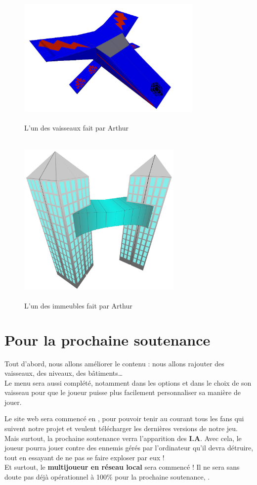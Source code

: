 \documentclass[10pt, titlepage]{report}
\begin{document}
\begin{figure}
\center
\includegraphics[height=6cm, width=9cm]{vaisseau_arthur.jpg}
\caption{L'un des vaisseaux fait par Arthur}

\includegraphics[height=8.5cm, width=8cm]{batiment_arthur.jpg}
\caption{L'un des immeubles fait par Arthur}

\end{figure}

\chapter{Pour la prochaine soutenance}

Tout d'abord, nous allons améliorer le contenu : nous allons rajouter des vaisseaux, des niveaux, des bâtiments\dots\\
Le menu sera aussi complété, notamment dans les options et dans le choix de son vaisseau pour que le joueur puisse plus facilement personnaliser sa manière de jouer.

Le site web sera commencé en , pour pouvoir tenir au courant tous les fans qui suivent notre projet et veulent télécharger les dernières versions de notre jeu.\\

Mais surtout, la prochaine soutenance verra l'apparition des \textbf{I.A}. Avec cela, le joueur pourra jouer contre des ennemis gérés par l'ordinateur qu'il devra détruire, tout en essayant de ne pas se faire exploser par eux !\\

 Et surtout, le \textbf{multijoueur en réseau local} sera commencé ! Il ne sera sans doute pas déjà opérationnel à 100\% pour la prochaine soutenance, .
\end{document}
